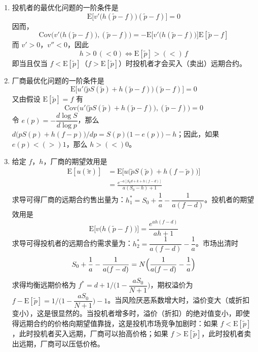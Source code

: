 \begin{solution}
\begin{enumerate}[label=(\alph*)]
    \item 投机者的最优化问题的一阶条件是
    \[
        \mathrm{E}\bigl[v'\bigl(h(\tilde{p}-f)\bigr)(\tilde{p}-f)\bigr]=0
    \]
    因而，
    \[
        \mathrm{Cov}\bigl(v'\bigl(h(\tilde{p}-f)\bigr),(\tilde{p}-f)\bigr)=-\mathrm{E}\bigl[v'\bigl(h(\tilde{p}-f)\bigr)\bigr]\mathrm{E}[\tilde{p}-f]
    \]
    而 $v'>0$，$v''<0$，因此
    \[
        h>0\,(<0)\Leftrightarrow \mathrm{E}[\tilde{p}]>(<)\,f
    \]
    即当且仅当 $f<\mathrm{E}[\tilde{p}]$（$f>\mathrm{E}[\tilde{p}]$）时投机者才会买入（卖出）远期合约。
    \item 厂商最优化问题的一阶条件是
    \[
        \mathrm{E}\bigl[u'\bigl(\tilde{p}S(\tilde{p})+h(\tilde{p}-f)\bigr)(\tilde{p}-f)\bigr]=0
    \]
    又由假设 $\mathrm{E}[\tilde{p}]=f$ 有
    \[
        \mathrm{Cov}\bigl(u'\bigl(\tilde{p}S(\tilde{p})+h(\tilde{p}-f)\bigr),(\tilde{p}-f)\bigr)=0
    \]
    令 $e(p)=-\dfrac{d\log S}{d\log p}$，那么 $d\bigl(pS(p)+h(f-p)\bigr)/dp=S(p)\bigl(1-e(p)\bigr)-h$；因此，如果 $e(p)<(>)1$，那么 $h>(<)0$。
    \item 给定 $f$，$h$，厂商的期望效用是
    \[
        \begin{aligned}
            \mathrm{E}[u(\tilde{\pi})]
            &=\mathrm{E}\bigl[u\bigl(\tilde{p}S(\tilde{p})+h(f-\tilde{p})\bigr)\bigr]\\
            &=\frac{e^{-a[S_{0}d+k+h(f-d)]}}{a(S_{0}-h)+1}
        \end{aligned}
    \]
    求导可得厂商的远期合约售出量为：$h_{1}^{*}=S_{0}+\dfrac{1}{a}-\dfrac{1}{a(f-d)}$。投机者的期望效用是
    \[
        \mathrm{E}\bigl[v\bigl(h(\tilde{p}-f)\bigr)\bigr]=\frac{e^{ah(f-d)}}{ah+1}
    \]
    求导可得投机者的远期合约需求量为：$h_{2}^{*}=\dfrac{1}{a(f-d)}-\dfrac{1}{a}$。市场出清时
    \[
        S_{0}+\frac{1}{a}-\frac{1}{a(f-d)}=N\Bigl(\frac{1}{a(f-d)}-\frac{1}{a}\Bigr)
    \]
    求得均衡远期价格为 $f^{*}=d+1/\bigl(1-\dfrac{aS_{0}}{N+1}\bigr)$，期权溢价为 $f-\mathrm{E}[\tilde{p}]=1/\bigl(1-\dfrac{aS_{0}}{N+1}\bigr)-1$。当风险厌恶系数增大时，溢价变大（或折扣变小），这是很显然的。当投机者增多时，溢价（折扣）的绝对值变小，即使得远期合约的价格向期望值靠拢，这是投机市场竞争加剧时：如果 $f<\mathrm{E}[\tilde{p}]$，此时投机者买入远期，厂商可以抬高价格；如果 $f>\mathrm{E}[\tilde{p}]$，此时投机者卖出远期，厂商可以压低价格。
\end{enumerate}
\end{solution}

